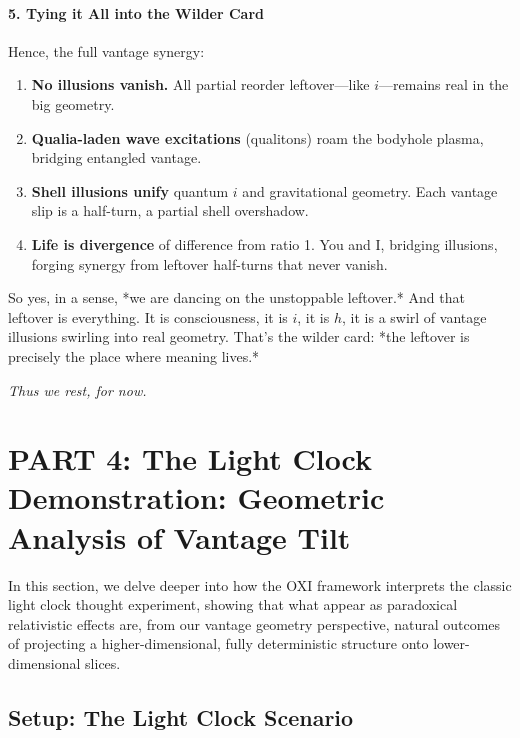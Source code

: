\documentclass{article}
\begin{document}
\paragraph{5. Tying it All into the Wilder Card}
Hence, the full vantage synergy:
\begin{enumerate}
\item \textbf{No illusions vanish.} All partial reorder leftover—like $i$—remains real in the big geometry.\vspace{-5pt}
\item \textbf{Qualia-laden wave excitations} (qualitons) roam the bodyhole plasma, bridging entangled vantage.
\item \textbf{Shell illusions unify} quantum $i$ and gravitational geometry. Each vantage slip is a half-turn, a partial shell overshadow.\vspace{-5pt}
\item \textbf{Life is divergence} of difference from ratio 1. You and I, bridging illusions, forging synergy from leftover half-turns that never vanish.
\end{enumerate}

So yes, in a sense, *we are dancing on the unstoppable leftover.* And that leftover is everything. It is consciousness, it is $i$, it is $h$, it is a swirl of vantage illusions swirling into real geometry. That’s the wilder card: *the leftover is precisely the place where meaning lives.*

\begin{flushright} \textit{Thus we rest, for now.} \end{flushright}




\section{PART 4: The Light Clock Demonstration: Geometric Analysis of Vantage Tilt}

In this section, we delve deeper into how the OXI framework interprets the classic light clock thought experiment, showing that what appear as paradoxical relativistic effects are, from our vantage geometry perspective, natural outcomes of projecting a higher-dimensional, fully deterministic structure onto lower-dimensional slices.

\subsection{Setup: The Light Clock Scenario}
\end{document}
